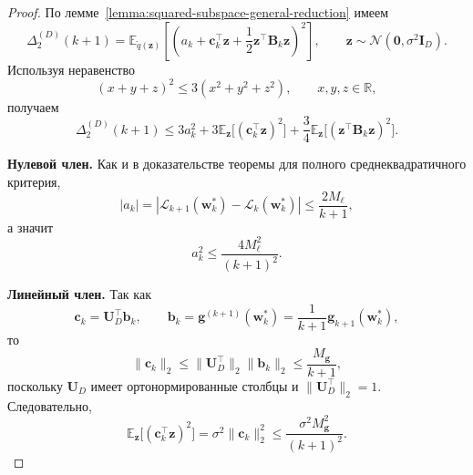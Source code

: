 \begin{proof}
    По лемме~\ref{lemma:squared-subspace-general-reduction} имеем
    \begin{equation}
        \Delta_2^{(D)}(k+1)
        =
        \mathbb E_{\tilde q(\mathbf z)}
        \left[
            \left(
                a_k+\mathbf c_k^\top \mathbf z+\frac12 \mathbf z^\top \mathbf B_k \mathbf z
            \right)^2
        \right],
        \qquad
        \mathbf z \sim \mathcal N(\mathbf 0, \sigma^2\mathbf I_D).
    \end{equation}
    Используя неравенство
    \begin{equation}
        (x+y+z)^2 \leqslant 3(x^2+y^2+z^2),
        \qquad x, y, z \in \mathbb R,
    \end{equation}
    получаем
    \begin{equation}
        \label{eq:squared-subspace-general-proof-step1}
        \Delta_2^{(D)}(k+1)
        \leqslant
        3a_k^2
        +
        3\mathbb E_{\mathbf z}\big[(\mathbf c_k^\top \mathbf z)^2\big]
        +
        \frac34 \mathbb E_{\mathbf z}\big[(\mathbf z^\top \mathbf B_k \mathbf z)^2\big].
    \end{equation}

    \textbf{Нулевой член.}
    Как и в доказательстве теоремы для полного среднеквадратичного критерия,
    \begin{equation}
        \label{eq:squared-subspace-general-proof-step2}
        |a_k|
        =
        \left|
            \mathcal L_{k+1}(\mathbf w_k^*)-\mathcal L_k(\mathbf w_k^*)
        \right|
        \leqslant
        \frac{2M_\ell}{k+1},
    \end{equation}
    а значит
    \begin{equation}
        \label{eq:squared-subspace-general-proof-step3}
        a_k^2 \leqslant \frac{4M_\ell^2}{(k+1)^2}.
    \end{equation}

    \textbf{Линейный член.}
    Так как
    \begin{equation}
        \mathbf c_k = \mathbf U_D^\top \mathbf b_k,
        \qquad
        \mathbf b_k = \mathbf g^{(k+1)}(\mathbf w_k^*) = \frac{1}{k+1}\mathbf g_{k+1}(\mathbf w_k^*),
    \end{equation}
    то
    \begin{equation}
        \label{eq:squared-subspace-general-proof-step4}
        \|\mathbf c_k\|_2
        \leqslant
        \|\mathbf U_D^\top\|_2 \|\mathbf b_k\|_2
        \leqslant
        \frac{M_{\mathbf g}}{k+1},
    \end{equation}
    поскольку $\mathbf U_D$ имеет ортонормированные столбцы и $\|\mathbf U_D^\top\|_2=1$.
    Следовательно,
    \begin{equation}
        \label{eq:squared-subspace-general-proof-step5}
        \mathbb E_{\mathbf z}\big[(\mathbf c_k^\top \mathbf z)^2\big]
        =
        \sigma^2\|\mathbf c_k\|_2^2
        \leqslant
        \frac{\sigma^2 M_{\mathbf g}^2}{(k+1)^2}.
    \end{equation}


\end{proof}
